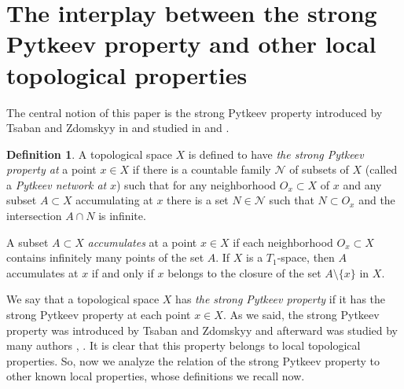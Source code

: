 \documentclass{amsart}
\theoremstyle{definition}
\newtheorem{definition}[theorem]{Definition}
\begin{document}
\section{The interplay between the strong Pytkeev property and other local topological properties}\label{s1}

The central notion of this paper is the strong Pytkeev property introduced by Tsaban and Zdomskyy in \cite{TZ} and studied in \cite{MSak2} and \cite{GKL}.

\begin{definition} A topological space $X$ is defined to have {\em the strong Pytkeev property at} a point $x\in X$ if there is a countable family $\mathcal N$ of subsets of $X$ (called a {\em Pytkeev network at} $x$) such that for any neighborhood $O_x\subset X$ of $x$ and any subset $A\subset X$ accumulating at $x$ there is a set $N\in\mathcal N$ such that $N\subset O_x$ and the intersection $A\cap N$ is infinite.
\end{definition}

 A subset $A\subset X$ {\em accumulates} at a point $x\in X$ if each neighborhood $O_x\subset X$ contains infinitely many points of the set $A$. If $X$ is a $T_1$-space, then $A$ accumulates at $x$ if and only if $x$ belongs to the closure of the set $A\setminus \{x\}$ in $X$.

We say that a topological space $X$ has {\em the strong Pytkeev property} if it has the strong Pytkeev property at each point $x\in X$.  As we said, the strong Pytkeev property was introduced by Tsaban and Zdomskyy \cite{TZ} and afterward was studied by many authors \cite{MSak2}, \cite{GKL}. It is clear that this property belongs to local topological properties.
So, now we analyze the relation of the strong Pytkeev property to other known local properties, whose definitions we recall now.
\end{document}

